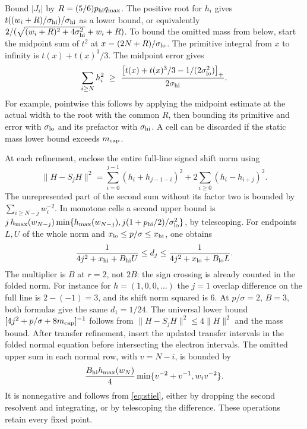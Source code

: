 \documentclass[11pt]{article}
\begin{document}
Bound $|J_i|$ by $R=(5/6)p_{\rm hi}q_{\max}$. The positive root for $h_i$ gives $t((w_i+R)/\sigma_{\rm hi})/\sigma_{\rm hi}$ as a lower bound, or equivalently $2/(\sqrt{(w_i+R)^2+4\sigma_{\rm hi}^2}+w_i+R)$. To bound the omitted mass from below, start the midpoint sum of $t^2$ at $x=(2N+R)/\sigma_{\rm lo}$. The primitive integral from $x$ to infinity is $t(x)+t(x)^3/3$. The midpoint error gives
\[
 \sum_{i\ge N}h_i^2\ \ge\
 \frac{\big[t(x)+t(x)^3/3-1/(2\sigma_{\rm lo}^2)\big]_+}{2\sigma_{\rm hi}} .
\]
For example, pointwise this follows by applying the midpoint estimate at the actual width to the root with the common $R$, then bounding its primitive and error with $\sigma_{\rm lo}$ and its prefactor with $\sigma_{\rm hi}$. A cell can be discarded if the static mass lower bound exceeds $m_{\rm cap}$.

At each refinement, enclose the entire full-line signed shift norm using
\[
 \|H-S_jH\|^2=\sum_{i=0}^{j-1}(h_i+h_{j-1-i})^2+2\sum_{i\ge0}(h_i-h_{i+j})^2 .
\]
The unrepresented part of the second sum without its factor two is bounded by $\sum_{i\ge N-j}w_i^{-2}$. In monotone cells a second upper bound is $j\,h_{\max}(w_{N-j})\min\{h_{\max}(w_{N-j}),j(1+p_{\rm hi}/2)/\sigma_{\rm lo}^2\}$, by telescoping. For endpoints $L,U$ of the whole norm and $x_{\rm lo}\le p/\sigma\le x_{\rm hi}$, one obtains
\[
 \frac1{4j^2+x_{\rm hi}+B_{\rm hi}U}\le d_j
 \le\frac1{4j^2+x_{\rm lo}+B_{\rm lo}L}.
\]
The multiplier is $B$ at $r=2$, not $2B$: the sign crossing is already counted in the folded norm. For instance for $h=(1,0,0,\ldots)$ the $j=1$ overlap difference on the full line is $2-(-1)=3$, and its shift norm squared is $6$. At $p/\sigma=2$, $B=3$, both formulas give the same $d_1=1/24$. The universal lower bound $[4j^2+p/\sigma+8m_{\rm cap}]^{-1}$ follows from $\|H-S_jH\|^2\le4\|H\|^2$ and the mass bound. After transfer refinement, insert the updated transfer intervals in the folded normal equation before intersecting the electron intervals. The omitted upper sum in each normal row, with $v=N-i$, is bounded by
\[
 \frac{B_{\rm hi}h_{\max}(w_N)}{4}\min\{v^{-2}+v^{-1},w_i v^{-2}\}.
\]
It is nonnegative and follows from \eqref{eq:stiel}, either by dropping the second resolvent and integrating, or by telescoping the difference. These operations retain every fixed point.
\end{document}
